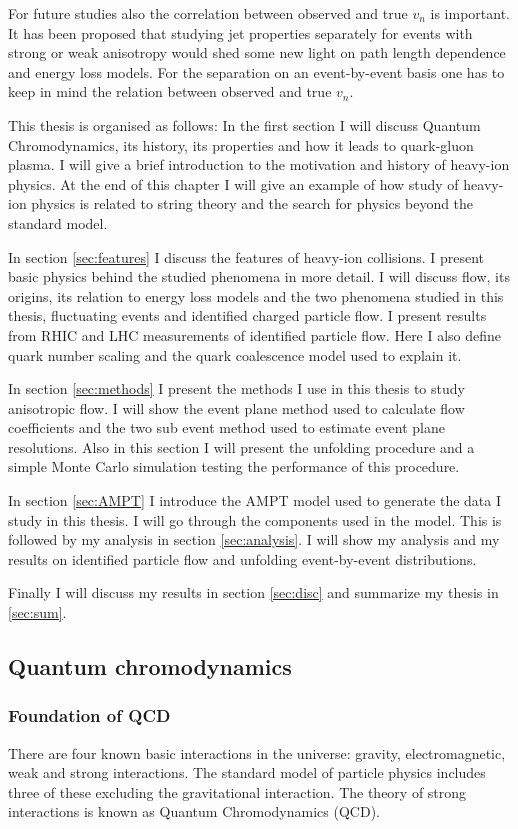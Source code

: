 For future studies also the correlation between observed and true $v_n$ is important. It has been proposed that studying jet properties separately for events with strong or weak anisotropy would shed some new light on path length dependence and energy loss models. For the separation on an event-by-event basis one has to keep in mind the relation between observed and true $v_n$.


This thesis is organised as follows: In the first section I will discuss Quantum Chromodynamics, its history, its properties and how it leads to quark-gluon plasma.
 I will give a brief introduction to the motivation and history of heavy-ion physics. At the end of this chapter I will give an example of how study of heavy-ion physics is related to string theory and the search for physics beyond the standard model.

In section \ref{sec:features} I discuss the features of heavy-ion collisions. I present basic physics behind the studied phenomena in more detail. I will discuss flow, its origins, its relation to energy loss models and the two phenomena studied in this thesis, fluctuating events and identified charged particle flow. I present results from RHIC and LHC measurements of identified particle flow. Here I also define quark number scaling and the quark coalescence model used to explain it.

In section \ref{sec:methods} I present the methods I use in this thesis to study anisotropic flow. I will show the event plane method used to calculate flow coefficients and the two sub event method used to estimate event plane resolutions. Also in this section I will present the unfolding procedure and a simple Monte Carlo simulation testing the performance of this procedure.

In section \ref{sec:AMPT} I introduce the AMPT model used to generate the data I study in this thesis. I will go through the components used in the model. This is followed by my analysis in section \ref{sec:analysis}. I will show my analysis and my results on identified particle flow and unfolding event-by-event distributions.

Finally I will discuss my results in section \ref{sec:disc} and summarize my thesis in \ref{sec:sum}.

\pagebreak
\subsection{Quantum chromodynamics}
\subsubsection{Foundation of QCD}
There are four known basic interactions in the universe: gravity, electromagnetic, weak and strong interactions. The standard model of particle physics includes three of these excluding the gravitational interaction. The theory of strong interactions is known as Quantum Chromodynamics (QCD).

